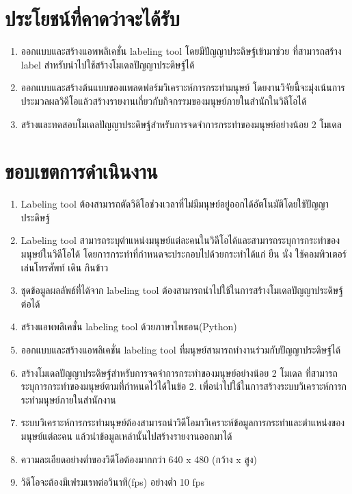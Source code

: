 
\section{ประโยชน์ที่คาดว่าจะได้รับ}
\begin{enumerate}
	\setlength\itemsep{-0.25em}
	\item ออกแบบและสร้างแอพพลิเคชั่น labeling tool โดยมีปัญญาประดิษฐ์เข้ามาช่วย ที่สามารถสร้าง label สำหรับนำไปใช้สร้างโมเดลปัญญาประดิษฐ์ได้
	\item ออกแบบและสร้างต้นแบบของแพลตฟอร์มวิเคราะห์การกระทำมนุษย์ โดยงานวิจัยนี้จะมุ่งเน้นการประมวลผลวิดีโอแล้วสร้างรายงานเกี่ยวกับกิจกรรมของมนุษย์ภายในสำนักในวิดีโอได้
	\item สร้างและทดสอบโมเดลปัญญาประดิษฐ์สำหรับการจดจำการกระทำของมนุษย์อย่างน้อย 2 โมเดล
\end{enumerate}
\clearpage

\section{ขอบเขตการดำเนินงาน}
\begin{enumerate}
	\setlength\itemsep{-0.25em}
	\item Labeling tool ต้องสามารถตัดวิดิโอช่วงเวลาที่ไม่มีมนุษย์อยู่ออกได้อัตโนมัติโดยใช้ปัญญาประดิษฐ์
	\item Labeling tool สามารถระบุตำแหน่งมนุษย์แต่ละคนในวิดีโอได้และสามารถระบุการกระทำของมนุษย์ในวิดีโอได้ 
	โดยการกระทำที่กำหนดจะประกอบไปด้วยกระทำได้แก่ ยืน นั่ง ใช้คอมพิวเตอร์ เล่นโทรศัพท์ เดิน กินข้าว 
	\item ชุดข้อมูลผลลัพธ์ที่ได้จาก labeling tool ต้องสามารถนำไปใช้ในการสร้างโมเดลปัญญาประดิษฐ์ต่อได้
	\item สร้างแอพพลิเคชั่น labeling tool ด้วยภาษาไพธอน(Python)
	\item ออกแบบและสร้างแอพลิเคชั่น labeling tool ที่มนุษย์สามารถทำงานร่วมกับปัญญาประดิษฐ์ได้
	\item สร้างโมเดลปัญญาประดิษฐ์สำหรับการจดจำการกระทำของมนุษย์อย่างน้อย 2 โมเดล ที่สามารถระบุการกระทำของมนุษย์ตามที่กำหนดไว้ได้ในข้อ 2. 
	เพื่อนำไปใช้ในการสร้างระบบวิเคราะห์การกระทำมนุษย์ภายในสำนักงาน
	\item ระบบวิเคราะห์การกระทำมนุษย์ต้องสามารถนำวิดีโอมาวิเคราะห์ข้อมูลการกระทำและตำแหน่งของมนุษย์แต่ละคน แล้วนำข้อมูลเหล่านั้นไปสร้างรายงานออกมาได้
	\item ความละเอียดอย่างต่ำของวิดีโอต้องมากกว่า 640 x 480 (กว้าง x สูง)
	\item วิดีโอจะต้องมีเฟรมเรทต่อวินาที(fps) อย่างต่ำ 10 fps
\end{enumerate}

